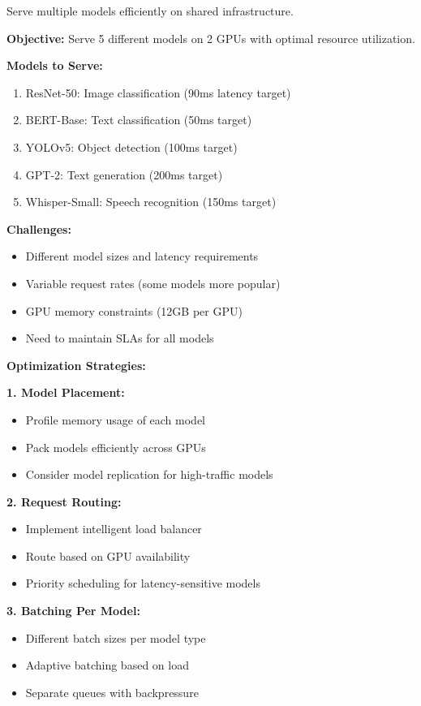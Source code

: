 Serve multiple models efficiently on shared infrastructure.

\textbf{Objective:} Serve 5 different models on 2 GPUs with optimal resource utilization.

\textbf{Models to Serve:}
\begin{enumerate}
    \item ResNet-50: Image classification (90ms latency target)
    \item BERT-Base: Text classification (50ms target)
    \item YOLOv5: Object detection (100ms target)
    \item GPT-2: Text generation (200ms target)
    \item Whisper-Small: Speech recognition (150ms target)
\end{enumerate}

\textbf{Challenges:}
\begin{itemize}
    \item Different model sizes and latency requirements
    \item Variable request rates (some models more popular)
    \item GPU memory constraints (12GB per GPU)
    \item Need to maintain SLAs for all models
\end{itemize}

\textbf{Optimization Strategies:}

\textbf{1. Model Placement:}
\begin{itemize}
    \item Profile memory usage of each model
    \item Pack models efficiently across GPUs
    \item Consider model replication for high-traffic models
\end{itemize}

\textbf{2. Request Routing:}
\begin{itemize}
    \item Implement intelligent load balancer
    \item Route based on GPU availability
    \item Priority scheduling for latency-sensitive models
\end{itemize}

\textbf{3. Batching Per Model:}
\begin{itemize}
    \item Different batch sizes per model type
    \item Adaptive batching based on load
    \item Separate queues with backpressure
\end{itemize}

